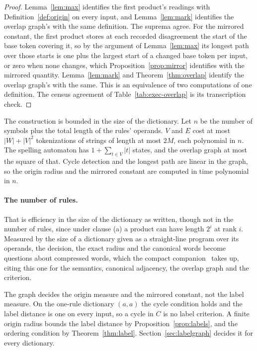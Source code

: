 \documentclass[11pt,a4paper]{article}
\theoremstyle{definition}
\theoremstyle{plain}
\begin{document}
\begin{proof}
Lemma~\ref{lem:max} identifies the first product's readings with Definition~\ref{def:origin} on every input, and
Lemma~\ref{lem:mark} identifies the overlap graph's with the same definition. The suprema agree. For the mirrored
constant, the first product stores at each recorded disagreement the start of the base token covering it, so by the
argument of Lemma~\ref{lem:max} its longest path over those starts is one plus the largest start of a changed base token
per input, or zero when none changes, which Proposition~\ref{prop:mirror} identifies with the mirrored quantity.
Lemma~\ref{lem:mark} and Theorem~\ref{thm:overlap} identify the overlap graph's with the same. This is an equivalence of
two computations of one definition. The census agreement of Table~\ref{tab:exec-overlap} is its transcription check.
\end{proof}
The construction is bounded in the size of the dictionary. Let \(n\) be the number of symbols plus the total length of
the rules' operands. \(V\) and \(E\) cost at most \(|W| + |V|^2\) tokenizations of strings of length at most \(2M\),
each polynomial in \(n\). The spelling automaton has \(1 + \sum_{t \in V} |t|\) states, and the overlap graph at most
the square of that. Cycle detection and the longest path are linear in the graph, so the origin radius and the mirrored
constant are computed in time polynomial in \(n\).

\paragraph{The number of rules.} That is efficiency in the size of the dictionary as written, though not in the number
of rules, since under clause (a) a product can have length \(2^i\) at rank \(i\). Measured by the size of a dictionary
given as a straight-line program over its operands, the decision, the exact radius and the canonical words become
questions about compressed words, which the compact companion~\citep{nidhogg2026compact} takes up, citing this one for
the semantics, canonical adjacency, the overlap graph and the criterion.

The graph decides the origin measure and the mirrored constant, not the label measure. On the one-rule dictionary
\((a, a)\) the cycle condition holds and the label distance is one on every input, so a cycle in \(C\) is no label
criterion. A finite origin radius bounds the label distance by Proposition~\ref{prop:labels}, and the ordering condition
by Theorem~\ref{thm:label}. Section~\ref{sec:labelgraph} decides it for every dictionary.
\end{document}
